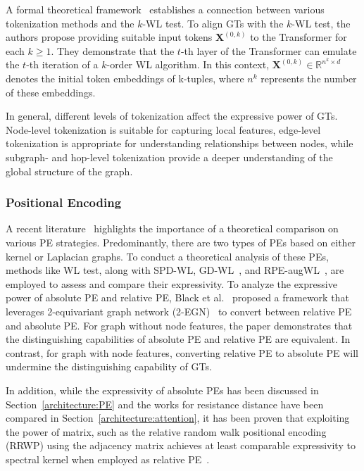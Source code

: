 A formal theoretical framework~\cite{expressive-token}
establishes a connection between various tokenization methods and the \(k\)-WL test. To align GTs with the \(k\)-WL test, the authors propose providing suitable input tokens \(\mathbf{X}^{(0,k)}\) to the Transformer for each \(k \geq 1\). They demonstrate that the \(t\)-th layer of the Transformer can emulate the \(t\)-th iteration of a \(k\)-order WL algorithm. In this context, \(\mathbf{X}^{(0,k)} \in \mathbb{R}^{n^k \times d}\) denotes the initial token embeddings of k-tuples, where \(n^k\) represents the number of these embeddings.

In general, different levels of tokenization affect the expressive power of GTs. Node-level tokenization is suitable for capturing local features, edge-level tokenization is appropriate for understanding relationships between nodes, while subgraph- and hop-level tokenization provide a deeper understanding of the global structure of the graph.

\subsubsection{Positional Encoding}
A recent literature~\cite{li2024what} highlights the importance of a theoretical comparison on various PE strategies. 
Predominantly, there are two types of PEs based on either kernel or Laplacian graphs. To conduct a theoretical analysis of these PEs, methods like WL test, along with SPD-WL, GD-WL~\cite{zhang2023rethinking}, and RPE-augWL~\cite{black2024comparing}, are employed to assess and compare their expressivity.
To analyze the expressive power of absolute PE and relative PE, Black et al.~\cite{black2024comparing} proposed a framework that leverages 2-equivariant graph network (2-EGN)~\cite{maron2018invariant} to convert between relative PE and absolute PE. For graph without node features, the paper demonstrates that the distinguishing capabilities of absolute PE and relative PE are equivalent.
In contrast, for graph with node features, converting relative PE to absolute PE will undermine the distinguishing capability of GTs.


In addition, while the expressivity of absolute PEs has been discussed in Section~\ref{architecture:PE} and the works for resistance distance have been compared in Section~\ref{architecture:attention}, it has been proven that exploiting the power of matrix, such as the relative random walk positional encoding (RRWP) using the adjacency matrix achieves at least comparable expressivity to spectral kernel when employed as relative PE~\cite{black2024comparing}.



